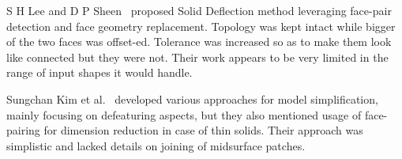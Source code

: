 

S H Lee and D P Sheen~\cite{Sheen2008} proposed Solid Deflection method leveraging face-pair detection and face geometry replacement. Topology was kept intact while bigger of the two faces was offset-ed. Tolerance was increased so as to make them look like connected but they were not. Their work appears to be very limited in the range of input shapes it would handle.
%


Sungchan Kim et al.~\cite{Kim2005} developed various approaches for model simplification, mainly focusing on defeaturing aspects, but they also mentioned usage of face-pairing for dimension reduction in case of thin solids. Their approach was simplistic and lacked details on joining of midsurface patches.


